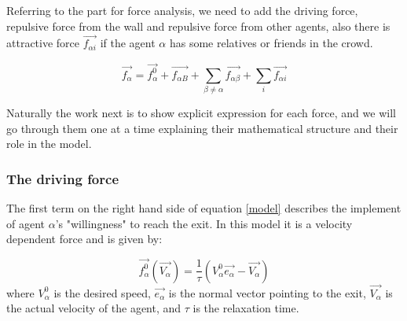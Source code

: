 Referring to the part for force analysis, we need to add the driving force, repulsive force from the wall and repulsive force from other agents, also there is attractive force $ \vec{f_{\alpha i}} $ if the agent $ \alpha $ has some relatives or friends in the crowd.

\begin{equation}\label{model}
    \vec{f_{\alpha}} = \vec{f^{0}_{\alpha}} + \vec{f_{\alpha B}} +
    \sum_{\beta \neq \alpha} \vec{f_{\alpha \beta}} +  
    \sum_{i} \vec{f_{\alpha i}} 
\end{equation}

Naturally the work next is to show explicit expression for each force, and we will go through them one at a time explaining their mathematical structure and their role in the model.\\

\subsubsection{The driving force} %
The first term on the right hand side of equation \eqref{model} describes the implement of agent $ \alpha $'s "willingness" to reach the exit. In this model it is a velocity dependent force 
and is given by:

\begin{equation}\label{relaxtime}
	\vec{f^{0}_{\alpha}}\left( \vec{V_{\alpha}} \right) =
    \frac{1}{\tau}
    \left( V_{\alpha}^{0} \vec{e_{\alpha}} - \vec{V_{\alpha}} \right)
\end{equation}
where $V_{\alpha}^{0}$ is the desired speed, $ \vec{e_{\alpha}} $ is the normal vector pointing to the exit, $\vec{V_{\alpha}}$ is the actual velocity of the agent, and $\tau$ is the relaxation time. \\

